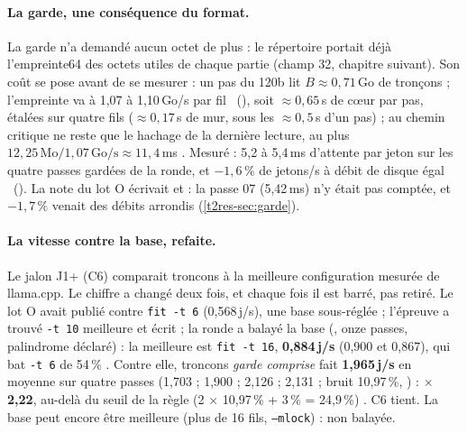 \paragraph{La garde, une conséquence du format.} La garde n'a demandé aucun octet de plus : le répertoire portait déjà l'empreinte64 des octets utiles de chaque partie (champ 32, chapitre suivant). Son coût se pose avant de se mesurer : un pas du 120b lit $B \approx 0{,}71$\,Go de tronçons ; l'empreinte va à 1,07 à 1,10\,Go/s par fil \mes~(), soit $\approx 0{,}65$\,s de cœur par pas, étalées sur quatre fils ($\approx 0{,}17$\,s de mur, sous les $\approx 0{,}5$\,s d'un pas) ; au chemin critique ne reste que le hachage de la dernière lecture, au plus $12{,}25\,\mathrm{Mo} / 1{,}07\,\mathrm{Go/s} \approx 11{,}4$\,ms \calc. Mesuré : 5,2 à 5,4\,ms d'attente par jeton sur les quatre passes gardées de la ronde, et $-1{,}6\,\%$ de jetons/s à débit de disque égal \mes~(). La note du lot O écrivait  et  : la passe 07 (5,42\,ms) n'y était pas comptée, et $-1{,}7\,\%$ venait des débits arrondis (\cref{t2res-sec:garde}).

\paragraph{La vitesse contre la base, refaite.} Le jalon J1+ (C6) comparait troncons à la meilleure configuration mesurée de llama.cpp. Le chiffre a changé deux fois, et chaque fois il est barré, pas retiré. Le lot O avait publié  contre \texttt{fit -t 6} (0,568\,j/s), une base sous-réglée ; l'épreuve a trouvé \texttt{-t 10} meilleure et écrit  ; la ronde a balayé la base (, onze passes, palindrome déclaré) : la meilleure est \texttt{fit -t 16}, \textbf{0,884\,j/s} (0,900 et 0,867), qui bat \texttt{-t 6} de 54\,\% \mes. Contre elle, troncons \emph{garde comprise} fait \textbf{1,965\,j/s} en moyenne sur quatre passes (1,703 ; 1,900 ; 2,126 ; 2,131 ; bruit 10,97\,\%, ) : \textbf{$\times$\,2,22}, au-delà du seuil de la règle (2 $\times$ 10,97\,\% + 3\,\% = 24,9\,\%) \mes. C6 tient. La base peut encore être meilleure (plus de 16 fils, \texttt{--mlock}) : non balayée.

